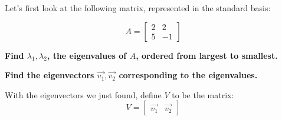 Let's first look at the following matrix, represented in the standard basis:

$$A = \begin{bmatrix}
2 & 2 \\
5 & -1
\end{bmatrix}$$

\begin{enumerate}

\qitem \textbf{Find $\lambda_1, \lambda_2$, the eigenvalues of $A$, ordered from largest to smallest.}
\vspace{2em}

\meta{}

\sol{}

\qitem \textbf{Find the eigenvectors $\vec{v_1}, \vec{v_2}$ corresponding to the eigenvalues.}
\vspace{2em}

\meta{}

\sol{}

\end{enumerate}

With the eigenvectors we just found, define $V$ to be the matrix:
$$V = \begin{bmatrix}
\vec{v_1} & \vec{v_2}
\end{bmatrix}$$

